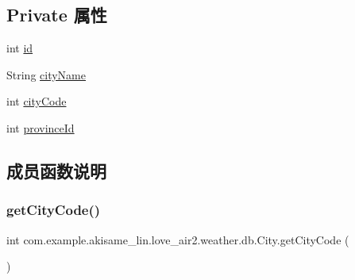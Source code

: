 \subsection*{Private 属性}
\begin{DoxyCompactItemize}
\item 
int \mbox{\hyperlink{classcom_1_1example_1_1akisame__lin_1_1love__air2_1_1weather_1_1db_1_1_city_a8d6e31822c7759b7ffe718ac62918097}{id}}
\item 
String \mbox{\hyperlink{classcom_1_1example_1_1akisame__lin_1_1love__air2_1_1weather_1_1db_1_1_city_ad92abb8ecea043b7c701f24763bb9f90}{city\+Name}}
\item 
int \mbox{\hyperlink{classcom_1_1example_1_1akisame__lin_1_1love__air2_1_1weather_1_1db_1_1_city_a40a6d9685a5ef5eb07c072eee49dfc5f}{city\+Code}}
\item 
int \mbox{\hyperlink{classcom_1_1example_1_1akisame__lin_1_1love__air2_1_1weather_1_1db_1_1_city_a15d55e5fa5b3247f2e3eb86bbbd4ceb1}{province\+Id}}
\end{DoxyCompactItemize}


\subsection{成员函数说明}
\mbox{\label{classcom_1_1example_1_1akisame__lin_1_1love__air2_1_1weather_1_1db_1_1_city_a3ea1f698abf66851282a7624599d85b2}} 
\subsubsection{\texorpdfstring{getCityCode()}{getCityCode()}}
{\footnotesize\ttfamily int com.\+example.\+akisame\+\_\+lin.\+love\+\_\+air2.\+weather.\+db.\+City.\+get\+City\+Code (\begin{DoxyParamCaption}{ }\end{DoxyParamCaption})\hspace{0.3cm}{\ttfamily [inline]}}

\mbox{\label{classcom_1_1example_1_1akisame__lin_1_1love__air2_1_1weather_1_1db_1_1_city_a8e5fc4edf06eaf9d85469d4ff033d31b}} 
